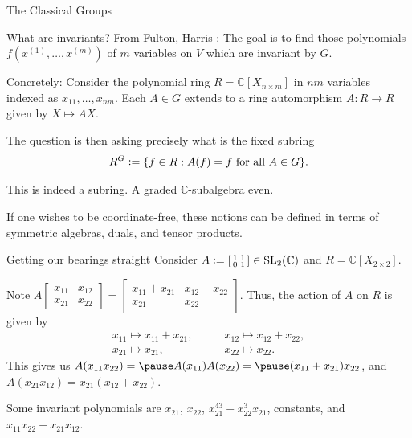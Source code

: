 \documentclass{beamer}
\newcommand{\deff}[1]{{\color{blue}#1}}
\newcommand{\smatrix}[1]{\left[\begin{smallmatrix} #1 \end{smallmatrix}\right]}
\DeclareMathOperator{\SL}{SL}
\DeclareMathOperator{\Sp}{Sp}
\newenvironment{blurb}
{\par\tiny}
{\par\addvspace{\bigskipamount}}
\begin{document}
\begin{frame}{The Classical Groups}
	  	
	\end{frame}

	\begin{frame}{What are invariants?}
		From Fulton, Harris \cite{FultonHarris}: The goal is to find those polynomials $f(x^{(1)}, \ldots, x^{(m)})$ of $m$ variables on $V$ which are invariant by $G$. \newline

		\pause Concretely: Consider the polynomial ring $R = \mathbb{C}[X_{n \times m}]$ in $nm$ variables indexed as $x_{11}, \ldots, x_{nm}$. \pause Each $A \in G$ extends to a ring automorphism $A : R \to R$ given by $X \mapsto AX$. \newline

		\pause The question is then asking precisely what is the \deff{fixed subring}
		\begin{equation*} 
			R^{G} \vcentcolon= \{f \in R : A(f) = f \text{ for all } A \in G\}.
		\end{equation*}

		\pause This is indeed a subring. \pause A graded $\mathbb{C}$-subalgebra even. 

		\pause
		\begin{blurb} 
			If one wishes to be coordinate-free, these notions can be defined in terms of symmetric algebras, duals, and tensor products.
		\end{blurb}
	\end{frame}

	\begin{frame}{Getting our bearings straight}
		Consider $A \vcentcolon= \smatrix{1 & 1 \\ 0 & 1} \in \SL_{2}(\mathbb{C})$ and $R = \mathbb{C}[X_{2 \times 2}]$. 

		\pause Note $A \smatrix{x_{11} & x_{12} \\ x_{21} & x_{22}} = \smatrix{x_{11} + x_{21} & x_{12} + x_{22} \\ x_{21} & x_{22}}$. \pause Thus, the action of $A$ on $R$ is given by
		\begin{align*} 
			x_{11} \mapsto x_{11} + x_{21},\qquad& x_{12} \mapsto x_{12} + x_{22}, \\
			x_{21} \mapsto x_{21},\qquad& x_{22} \mapsto x_{22}.
		\end{align*}
		\pause This gives us $A(x_{11} x_{22}) = \pause A(x_{11}) A(x_{22}) = \pause (x_{11} + x_{21})x_{22}$, \pause and $A(x_{21} x_{12}) = x_{21}(x_{12} + x_{22})$. \newline

		\pause Some invariant polynomials are \pause $x_{21}$, \pause $x_{22}$, \pause $x_{21}^{43} - x_{22}^{3} x_{21}$, \pause constants, \pause and $x_{11} x_{22} - x_{21} x_{12}$.
	\end{frame}
\end{document}
